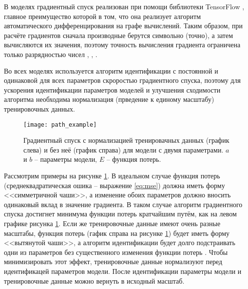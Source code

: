 	В моделях градиентный спуск реализован при помощи библиотеки TensorFlow
	\cite{tf_website}, главное преимущество которой в том, что она реализует
	алгоритм автоматического дифференцирования на графе вычислений. Таким 
	образом, при расчёте градиентов сначала производные берутся символьно 
	(точно), а затем вычисляются их значения, поэтому точность вычисления 
	градиента ограничена только разрядностью чисел \cite{hands_on_ml},
	\cite{nikolenko_deep_learning}, \cite{tf_website}.

	Во всех моделях используется алгоритм идентификации с постоянной и одинаковой
	для всех параметров скроростью градиентного спуска, поэтому для ускорения 
	идентификации параметров моделей и улучшения сходимости алгоритма необходима 
	нормализация (прведение к единому масштабу) тренировочных данных.
	
	\begin{figure}[!htp]
		\centering
		\texttt{[image: path\_example]}
		\caption{Градиентный спуск с нормализацией тренировачных данных (график
		слева) и без неё (график справа) для модели с двумя параметрами. $a$ и 
		$b$ -- параметры модели, $E$ -- функция потерь.}
		\label{pic:path_example}
	\end{figure}

	Рассмотрим примеры на рисунке \ref{pic:path_example}. В идеальном случае 
	функция потерь (среднеквадратическая ошика -- выражение \ref{eq:mse}) должна
	иметь форму <<симметричной чаши>>, а изменение обоих параметров должно вносить 
	одинаковый вклад в значение градиента. В таком случае алгоритм градиентного 
	спуска достигнет минимума функции потерь кратчайшим путём, как на левом 
	графике рисунка \ref{pic:path_example}. Если же тренировочные данные имеют
	очень разные масштабы, функция потерь (гафик справа на рисунке 
	\ref{pic:path_example}) будет иметь форму <<вытянутой чаши>>, а алгоритм 
	идентификации будет долго подстраивать одни из параметров без существенного
	изменения функции потерь \cite{hands_on_ml}. Чтобы минимизировать этот 
	эффект,	тренировочные данные нормализуют перед идентификацей параметров 
	модели. После идентификации параметры модели и тренировочные данные можно
	вернуть в исходный масштаб.

